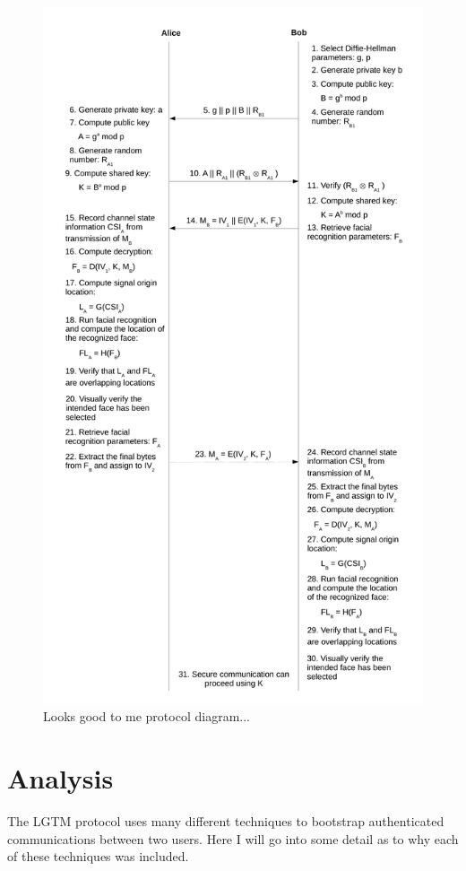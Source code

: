 \documentclass[12pt]{report}
\begin{document}
\begin{figure}
\center
\includegraphics[scale=0.6]{../figures/looks-good-to-me-protocol-diagram.pdf}
\caption{Looks good to me protocol diagram...}
\label{protocol-diagram}
\end{figure}


\section{Analysis}
The LGTM protocol uses many different techniques to bootstrap authenticated communications between two users. Here I will go into some detail as to why each of these techniques was included. \\
\end{document}

